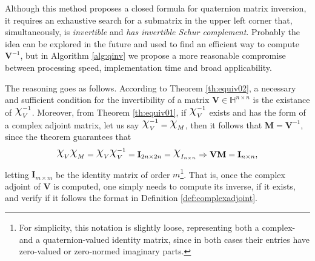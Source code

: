 Although this method proposes a closed formula for quaternion matrix inversion, it requires an exhaustive search for a submatrix in the upper left corner that, simultaneously, is \textit{invertible} and \textit{has invertible Schur complement}. Probably the idea can be explored in the future and used to find an efficient way to compute $\mathbf{V}^{-1}$, but in Algorithm \ref{alg:qinv} we propose a more reasonable compromise between processing speed, implementation time and broad applicability.

The reasoning goes as follows. According to Theorem \ref{th:equiv02}, a necessary and sufficient condition for the invertibility of a matrix $\mathbf{V} \in \mathbb{H}^{n \times n}$ is the existance of $\rchi^{-1}_{V}$. Moreover, from Theorem \ref{th:equiv01}, if $\rchi^{-1}_{V}$ exists and has the form of a complex adjoint matrix, let us say $\rchi_{V}^{-1} = \rchi_{M}$, then it follows that $\mathbf{M} = \mathbf{V}^{-1}$, since the theorem guarantees that
\begin{equation}
    \rchi_{V} \rchi_{M} = \rchi_{V} \rchi_{V}^{-1} = \mathbf{I}_{2n \times 2n} = \rchi_{I_{n \times n}}
    \Rightarrow \mathbf{V} \mathbf{M} = \mathbf{I}_{n \times n},
\end{equation}
letting $\mathbf{I}_{m \times m}$ be the identity matrix of order $m$\footnote{For simplicity, this notation is slightly loose, representing both a complex- and a quaternion-valued identity matrix, since in both cases their entries have zero-valued or zero-normed imaginary parts.}. That is, once the complex adjoint of $\mathbf{V}$ is computed, one simply needs to compute its inverse, if it exists, and verify if it follows the format in Definition \ref{def:complexadjoint}.


